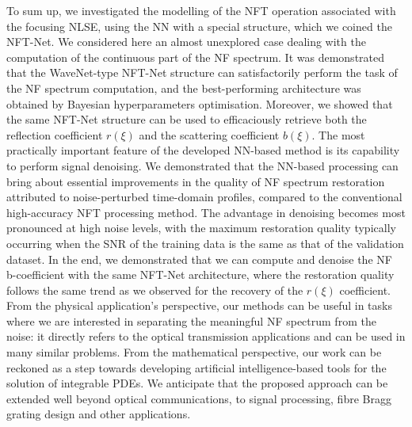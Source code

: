 To sum up, we investigated the modelling of the NFT operation associated with the focusing NLSE, using the NN with a special structure, which we coined the NFT-Net. We considered here an almost unexplored case dealing with the computation of the continuous part of the NF spectrum. It was demonstrated that the WaveNet-type NFT-Net structure can satisfactorily perform the task of the NF spectrum computation, and the best-performing architecture was obtained by Bayesian hyperparameters optimisation. Moreover, we showed that the same NFT-Net structure can be used to efficaciously retrieve both the reflection coefficient $r(\xi)$ and the scattering coefficient $b(\xi)$. The most practically important feature of the developed NN-based method is its capability to perform signal denoising.  We demonstrated that the NN-based processing can bring about essential improvements in the quality of NF spectrum restoration attributed to noise-perturbed time-domain profiles, compared to the conventional high-accuracy NFT processing method. The advantage in denoising becomes most pronounced at high noise levels, with the maximum restoration quality typically occurring when the SNR of the training data is the same as that of the validation dataset. 
In the end, we demonstrated that we can compute and denoise the NF b-coefficient with the same NFT-Net architecture, where the restoration quality follows the same trend as we observed for the recovery of the $r(\xi)$ coefficient. From the physical application's perspective, our methods can be useful in tasks where we are interested in separating the meaningful NF spectrum from the noise: it directly refers to the optical transmission applications and can be used in many similar problems. From the mathematical perspective, our work can be reckoned as a step towards developing artificial intelligence-based tools for the solution of integrable PDEs. We anticipate that the proposed approach can be extended well beyond optical communications, to signal processing, fibre Bragg grating design \cite{FBG01,FBG02} and other applications.

